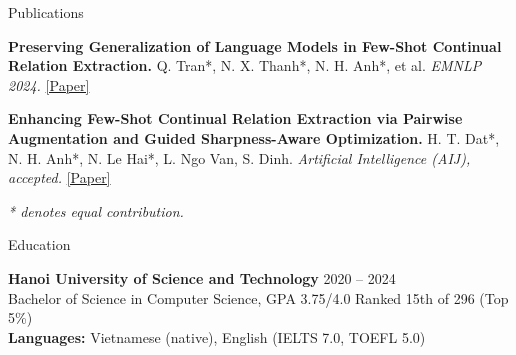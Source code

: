 \documentclass{resume} %
\begin{document}
\begin{rSection}{Publications}
\begin{enumerate}[leftmargin=1.8em,label={[\arabic*]},itemsep=0em,topsep=0.1em]
    \item \textbf{Preserving Generalization of Language Models in Few-Shot
    Continual Relation Extraction.}
    Q. Tran*, N. X. Thanh*, N. H. Anh*, et al.
    \textit{EMNLP 2024.}
    \href{https://aclanthology.org/2024.emnlp-main.763/}{[Paper]}

    \item \textbf{Enhancing Few-Shot Continual Relation Extraction via
    Pairwise Augmentation and Guided Sharpness-Aware Optimization.}
    H. T. Dat*, N. H. Anh*, N. Le Hai*, L. Ngo Van, S. Dinh.
    \textit{Artificial Intelligence (AIJ), accepted.}
    \href{https://www.sciencedirect.com/science/article/pii/S0004370226001712}{[Paper]}

\end{enumerate}
\textit{* denotes equal contribution.}

\end{rSection}


\begin{rSection}{Education}

\textbf{Hanoi University of Science and Technology} \hfill 2020 -- 2024\\
Bachelor of Science in Computer Science, GPA 3.75/4.0
\hfill Ranked 15th of 296 (Top 5\%)\\
\textbf{Languages:} Vietnamese (native), English (IELTS 7.0, TOEFL 5.0)

\end{rSection}
\end{document}
